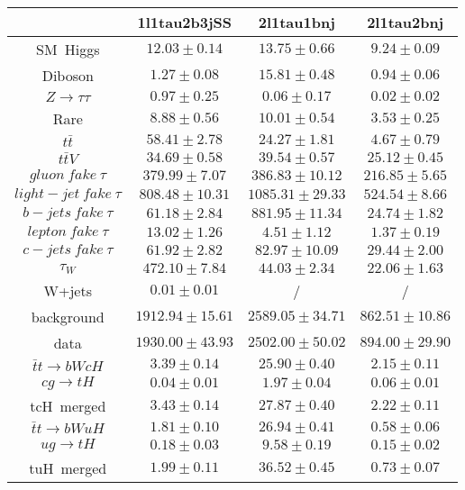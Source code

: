 \centering
\begin{tabular}{|c|c|c|c|} \hline
 & 1l1tau2b3jSS & 2l1tau1bnj & 2l1tau2bnj\\\hline
SM~Higgs & $12.03\pm0.14$ & $13.75\pm0.66$ & $9.24\pm0.09$\\\hline
Diboson & $1.27\pm0.08$ & $15.81\pm0.48$ & $0.94\pm0.06$\\\hline
$Z\to\tau\tau$ & $0.97\pm0.25$ & $0.06\pm0.17$ & $0.02\pm0.02$\\\hline
Rare & $8.88\pm0.56$ & $10.01\pm0.54$ & $3.53\pm0.25$\\\hline
$t\bar{t}$ & $58.41\pm2.78$ & $24.27\pm1.81$ & $4.67\pm0.79$\\\hline
$t\bar{t}V$ & $34.69\pm0.58$ & $39.54\pm0.57$ & $25.12\pm0.45$\\\hline
$gluon~fake~\tau$ & $379.99\pm7.07$ & $386.83\pm10.12$ & $216.85\pm5.65$\\\hline
$light-jet~fake~\tau$ & $808.48\pm10.31$ & $1085.31\pm29.33$ & $524.54\pm8.66$\\\hline
$b-jets~fake~\tau$ & $61.18\pm2.84$ & $881.95\pm11.34$ & $24.74\pm1.82$\\\hline
$lepton~fake~\tau$ & $13.02\pm1.26$ & $4.51\pm1.12$ & $1.37\pm0.19$\\\hline
$c-jets~fake~\tau$ & $61.92\pm2.82$ & $82.97\pm10.09$ & $29.44\pm2.00$\\\hline
$\tau_{W}$ & $472.10\pm7.84$ & $44.03\pm2.34$ & $22.06\pm1.63$\\\hline
W+jets & $0.01\pm0.01$ &  / &  /\\\hline
background & $1912.94\pm15.61$ & $2589.05\pm34.71$ & $862.51\pm10.86$\\\hline
data & $1930.00\pm43.93$ & $2502.00\pm50.02$ & $894.00\pm29.90$\\\hline
$\bar{t}t\to bWcH$ & $3.39\pm0.14$ & $25.90\pm0.40$ & $2.15\pm0.11$\\\hline
$cg\to tH$ & $0.04\pm0.01$ & $1.97\pm0.04$ & $0.06\pm0.01$\\\hline
tcH~merged & $3.43\pm0.14$ & $27.87\pm0.40$ & $2.22\pm0.11$\\\hline
$\bar{t}t\to bWuH$ & $1.81\pm0.10$ & $26.94\pm0.41$ & $0.58\pm0.06$\\\hline
$ug\to tH$ & $0.18\pm0.03$ & $9.58\pm0.19$ & $0.15\pm0.02$\\\hline
tuH~merged & $1.99\pm0.11$ & $36.52\pm0.45$ & $0.73\pm0.07$\\\hline
\end{tabular}
